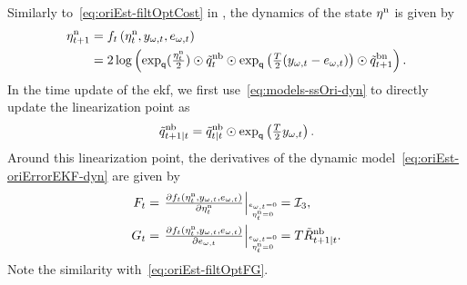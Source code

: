 Similarly to~\eqref{eq:oriEst-filtOptCost} in , the dynamics of the state $\eta^\text{n}$ is given by  
\begin{align}
\eta_{t+1}^\text{n} &= f_t \left( \eta_t^\text{n},y_{\omega,t},e_{\omega,t} \right)  \nonumber \\
&= 2 \log \left( \exp_\mathsf{q}(\tfrac{ \eta^\text{n}_t}{2}) \odot \tilde{q}_{t}^\text{nb} \odot  \exp_\mathsf{q} \left( \tfrac{T}{2} (y_{\omega,t} - e_{\omega,t}) \right) \odot \tilde{q}_{t+1}^\text{bn} \right).  
\label{eq:oriEst-oriErrorEKF-dyn}
\end{align}
In the time update of the \gls{ekf}, we first use~\eqref{eq:models-ssOri-dyn} to directly update the linearization point as
\begin{align}
\tilde{q}^\text{nb}_{t+1 \mid t} = \tilde{q}^\text{nb}_{t \mid t} \odot \exp_\mathsf{q} \left( \tfrac{T}{2} y_{\omega,t} \right).
\label{eq:oriEst-oriErrorEKF-dynUpdateLin}
\end{align}
Around this linearization point, the derivatives of the dynamic model~\eqref{eq:oriEst-oriErrorEKF-dyn} are given by
\begin{subequations}
\begin{align}
F_t &= \givenThat{\tfrac{\partial f_t(\oriError_t^\text{n},y_{\omega,t},e_{\omega,t})}{\partial \oriError_t^\text{n}}}{\oriError^\text{n}_t=0}{e_{\omega,t}=0} = \mathcal{I}_3 , 
\nonumber \\
G_t &= \givenThat{\tfrac{\partial f_t(\oriError^\text{n}_t,y_{\omega,t},e_{\omega,t})}{\partial e_{\omega,t}}}{\oriError^\text{n}_t=0}{e_{\omega,t}=0}  = T \tilde{R}_{t+1 \mid t}^\text{nb}. 
\end{align}
\label{eq:oriEst-oriErrorEKF-dynDer}
\end{subequations}
Note the similarity with~\eqref{eq:oriEst-filtOptFG}.

